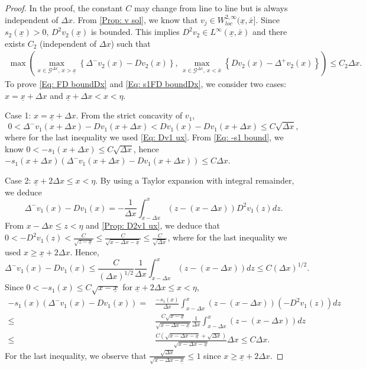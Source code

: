 \documentclass[11pt]{article}
\numberwithin{equation}{section}
\numberwithin{algorithm}{section}
\newcommand{\lc}{\left(}
\newcommand{\rc}{\right)}
\newcommand{\ux}{{\underline x}}
\newcommand{\g}{\gamma}
\newcommand{\p}{\psi}
\theoremstyle{plain}
\newcommand{\D}{\Delta}
\newcommand{\Dx}{{\Delta x}}
\begin{document}
\begin{proof}
In the proof, the constant $C$ may change from line to line but is always independent of $\D x$. From \cref{Prop: v sol}, we know that $v_j\in W^{2,\infty}_{loc}(\ux,\bar{x}]$. Since $s_2(\ux)>0$,  $D^2 v_2(\ux)$ is bounded. This implies $D^2 v_2\in L^\infty(\ux,\bar{x})$ and there exists $C_2$ (independent of $\D x$) such that 
$$
\begin{aligned}
\max\lc\max_{x\in \mathcal{G}^{\D x},\,x>\ux}\left\{\D^-{v_{2}(x)}-Dv_{2}(x)\right\},\,\max_{x\in \mathcal{G}^{\D x},\,x<\bar{x}}\left\{Dv_{2}(x)-\D^+{v_{2}(x)}\right\}\rc\leq C_2\Dx.
\end{aligned}
$$
To prove \cref{Eq: FD boundDx} and \cref{Eq: s1FD boundDx}, we consider two cases: $x=\ux+\D x$ and $\ux+\D x<x<\eta$.\par
Case 1:  $x=\ux+\D x$. From the strict concavity of $v_1$, 
$$
0<\D^-{v_{1}(x+\D x)}-Dv_{1}(x+\D x)<Dv_{1}(x)-Dv_{1}(x+\D x)\leq C\sqrt{\D x},
$$ 
where for the last inequality we used \cref{Eq: Dv1 ux}. From \cref{Eq: -s1 bound}, we know $0<-s_1(x+\D x)\leq C\sqrt{\D x}$, hence
$
-s_1(x+\D x)\lc\D^-{v_{1}(x+\D x)}-Dv_{1}(x+\D x)\rc \leq C\D x.
$\par
 Case 2: $\ux+2\D x\leq x< \eta$. By using a Taylor expansion with integral remainder, we deduce
$$
\D^-{v_{1}(x)}-Dv_{1}(x)=-\frac{1}{\D x}\int_{x-\D x}^{x}(z-(x-\D x))D^2v_1(z)dz.
$$
From $x-\D x\leq z<\eta$ and \cref{Prop: D2v1 ux}, we deduce that $0<-D^2v_1(z)<\frac{C}{\sqrt{z-\ux}}\leq \frac{C}{\sqrt{x-\D x-\ux}}\leq \frac{C}{\sqrt{\D x}}$, where for the last inequality we used $x\geq \ux+2\D x$. Hence,  
$$
\D^-{v_{1}(x)}-Dv_{1}(x)\leq \frac{C}{(\D x)^{1/2}}\frac{1}{\D x}\int_{x-\D x}^{x}(z-(x-\D x))dz\leq C(\D x)^{1/2}.
$$
Since $0<-s_1(x)\leq C\sqrt{x-\ux}$ for $\ux+2\D x\leq x< \eta$, 
$$
\begin{aligned}
-s_1(x)\lc\D^-{v_{1}(x)}-Dv_{1}(x)\rc={}&\frac{-s_1(x)}{\D x}\int_{x-\D x}^{x}(z-(x-\D x))\lc-D^2v_1(z)\rc dz\\
\leq {}&\frac{C\sqrt{x-\ux}}{\sqrt{x-\D x-\ux}}\frac{1}{\D x}\int_{x-\D x}^{x}(z-(x-\D x))dz\\
\leq {}&\frac{C(\sqrt{x-\D x-\ux}+\sqrt{\D x})}{\sqrt{x-\D x-\ux}}\D x\leq C\D x.
\end{aligned}
$$
For the last inequality, we observe that $\frac{\sqrt{\D x}}{\sqrt{x-\D x-\ux}}\leq 1$ since $x\geq \ux+2\D x$. 

\end{proof}
\end{document}
